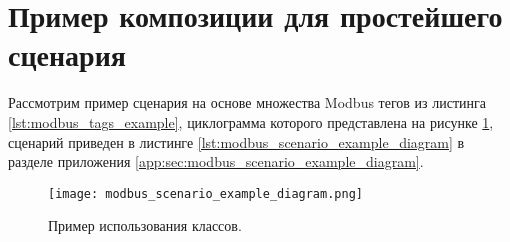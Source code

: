 \clearpage
\section{Пример композиции для простейшего сценария}

Рассмотрим пример сценария на основе множества Modbus тегов из листинга \ref{lst:modbus_tags_example},
циклограмма которого представлена на рисунке \ref{fig:modbus_scenario_example_diagram},
сценарий приведен в листинге \ref{lst:modbus_scenario_example_diagram} в разделе приложения \ref{app:sec:modbus_scenario_example_diagram}.

\begin{landscape}
    \begin{center}
        \begin{figure}
            \texttt{[image: modbus\_scenario\_example\_diagram.png]}
            \caption{Пример использования классов.}\label{fig:modbus_scenario_example_diagram}
        \end{figure}
    \end{center}
\end{landscape}
